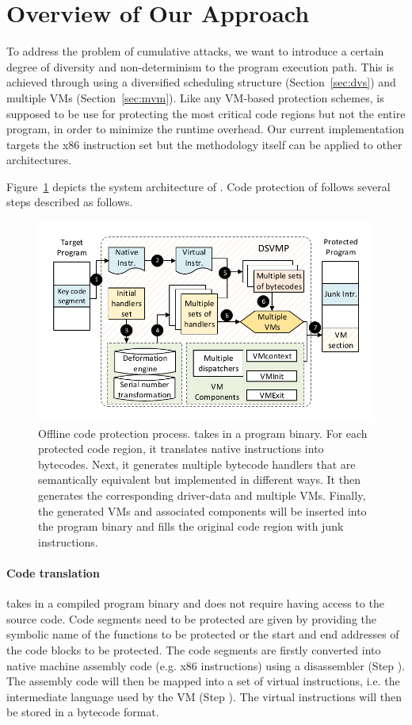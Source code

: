 \section{Overview of Our Approach}\label{sec:overview}
To address the problem of cumulative attacks, we want to introduce a certain
degree of diversity and non-determinism to the program execution path. This is achieved
through using a diversified scheduling structure (Section~\ref {sec:dvs}) and
multiple VMs (Section~\ref {sec:mvm}). Like any VM-based protection schemes,
\DSVMP is supposed to be use for protecting the most critical code regions but not the entire program, in order to minimize the runtime overhead.
Our current implementation targets the x86 instruction set but the methodology itself can be
applied to other architectures.


Figure~\ref{fig:Fig.overview} depicts the system architecture of \DSVMP.
Code protection of \DSVMP follows several steps described as follows.

\begin{figure}[!t]
  \centering
  \includegraphics[width=0.7\columnwidth]{figure/figoverview.pdf}
  \caption{Offline code protection process. \DSVMP takes in a program binary. For each protected code region, it translates native instructions into bytecodes. Next, it generates multiple bytecode handlers that are semantically equivalent but implemented in different ways. It then generates the corresponding driver-data and multiple VMs. Finally, the generated VMs and associated components will be inserted into the program binary and fills the original code region with junk instructions.}\label{fig:Fig.overview}
\end{figure}

\paragraph*{Code translation} \DSVMP takes in a compiled program binary and
does not require having access to the source code. Code segments need to be
protected are given by providing the symbolic name of the functions to be protected or the
 start and end addresses of the code blocks to be protected. The code segments are
firstly converted into native machine assembly code (e.g. x86 instructions)
using a disassembler (Step ). The assembly code will then be mapped into a set of virtual instructions, i.e.
the intermediate language used by the VM (Step ).
The virtual instructions will then be stored in a bytecode format.

